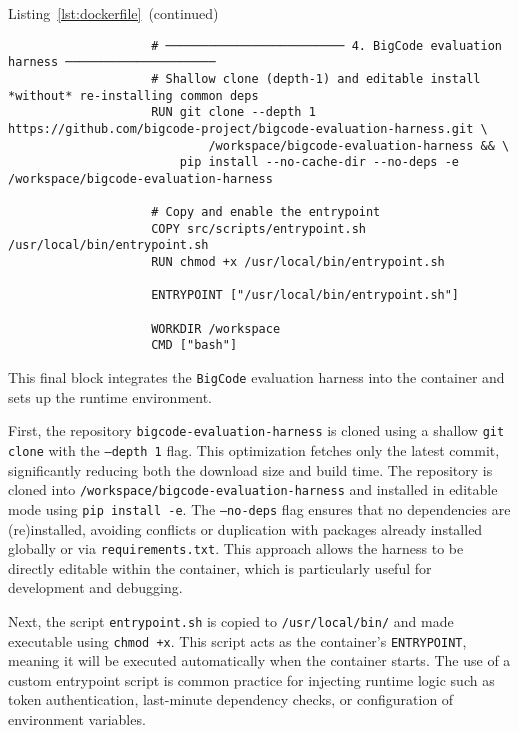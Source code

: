 \begin{minipage}{\textwidth}
	\captionsetup{type=listing}
	\caption*{Listing~\ref{lst:dockerfile}~(continued)}

	\begin{verbatim}
                    # ───────────────────────── 4. BigCode evaluation harness ─────────────────────
                    # Shallow clone (depth-1) and editable install *without* re-installing common deps
                    RUN git clone --depth 1 https://github.com/bigcode-project/bigcode-evaluation-harness.git \
                            /workspace/bigcode-evaluation-harness && \
                        pip install --no-cache-dir --no-deps -e /workspace/bigcode-evaluation-harness
                   
                    # Copy and enable the entrypoint
                    COPY src/scripts/entrypoint.sh /usr/local/bin/entrypoint.sh
                    RUN chmod +x /usr/local/bin/entrypoint.sh
                   
                    ENTRYPOINT ["/usr/local/bin/entrypoint.sh"]
                   
                    WORKDIR /workspace
                    CMD ["bash"]

    \end{verbatim}
\end{minipage}

This final block integrates the \texttt{BigCode} evaluation harness into the container and sets up the runtime environment.

First, the repository \texttt{bigcode-evaluation-harness} is cloned using a shallow \texttt{git clone} with the \texttt{--depth 1} flag. This optimization fetches only the latest commit, significantly reducing both the download size and build time. The repository is cloned into \texttt{/workspace/bigcode-evaluation-harness} and installed in editable mode using \texttt{pip install -e}. The \texttt{--no-deps} flag ensures that no dependencies are (re)installed, avoiding conflicts or duplication with packages already installed globally or via \texttt{requirements.txt}. This approach allows the harness to be directly editable within the container, which is particularly useful for development and debugging.

Next, the script \texttt{entrypoint.sh} is copied to \texttt{/usr/local/bin/} and made executable using \texttt{chmod +x}. This script acts as the container's \texttt{ENTRYPOINT}, meaning it will be executed automatically when the container starts. The use of a custom entrypoint script is common practice for injecting runtime logic such as token authentication, last-minute dependency checks, or configuration of environment variables.

